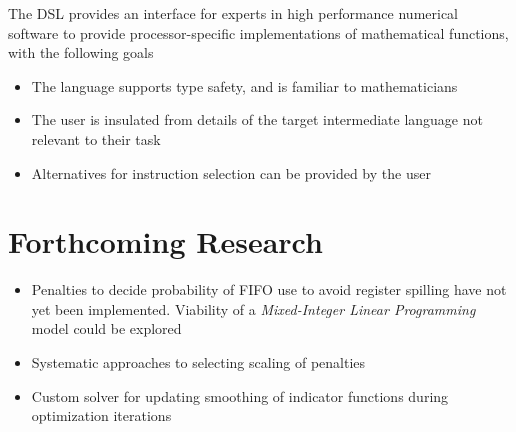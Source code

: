 \documentclass[a0,landscape,24pt]{a0poster}
\begin{document}
\begin{multicols}{3}
The DSL provides an interface for experts in high performance numerical software to provide processor-specific implementations of mathematical functions, with the following goals

\begin{itemize}
 \item The language supports type safety, and is familiar to mathematicians
 \item The user is insulated from details of the target intermediate language not relevant to their task
 \item Alternatives for instruction selection can be provided by the user
\end{itemize}	


\color{SaddleBrown} %

\section*{Forthcoming Research}

\begin{itemize}
\item Penalties to decide probability of FIFO use to avoid register spilling have not yet been implemented. Viability of a {\it Mixed-Integer Linear Programming}  model could be explored
\item Systematic approaches to selecting scaling of penalties
\item Custom solver for updating smoothing of indicator functions during optimization iterations
\end{itemize}

\color{DarkSlateGray} %



\nocite{*} %



\end{multicols}
\end{document}

